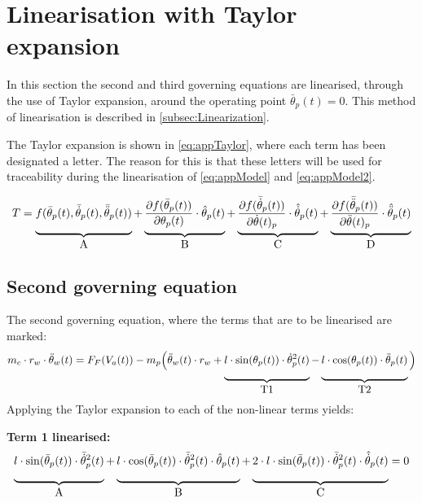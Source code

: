 \section{Linearisation with Taylor expansion}\label{appTaylor}
In this section the second and third governing equations are linearised, through the use of Taylor expansion, around the operating point $\bar{\theta}_p(t) = 0$. This method of linearisation is described in \autoref{subsec:Linearization}.

The Taylor expansion is shown in \autoref{eq:appTaylor}, where each term has been designated a letter. The reason for this is that these letters will be used for traceability during the linearisation of \autoref{eq:appModel} and \autoref{eq:appModel2}.


\begin{align}
T = \underbrace{f(\bar{\theta}_p(t),\bar{\dot \theta}_p(t),\bar{\ddot \theta}_p(t))\rule[-12pt]{0pt}{5pt}}_{\mbox{A}} + \underbrace{\frac{\partial f(\bar{\theta}_p(t))}{\partial\theta_p(t)}\cdot \hat{\theta}_p(t)\rule[-12pt]{0pt}{5pt}}_{\mbox{B}} + \underbrace{\frac{\partial f(\bar{\dot \theta}_p(t))}{\partial \dot \theta(t)_p}\cdot \hat{\dot \theta}_p(t)\rule[-12pt]{0pt}{5pt}}_{\mbox{C}} + \underbrace{\frac{\partial f(\bar{\ddot \theta}_p(t))}{\partial \ddot \theta(t)_p}\cdot \hat{\ddot \theta}_p(t)\rule[-12pt]{0pt}{5pt}}_{\mbox{D}}
\label{eq:appTaylor}
\end{align}

\subsection*{Second governing equation}
The second governing equation, where the terms that are to be linearised are marked:
\begin{align}
m_c \cdot r_w \cdot \ddot \theta_w(t) = F_F(V_a(t)) - m_p\Big(\ddot \theta_w(t) \cdot r_w + \underbrace{l \cdot \sin(\theta_p(t))\cdot \dot\theta_p^2(t)\rule[-12pt]{0pt}{5pt}}_{\mbox{T1}} - \underbrace{l \cdot \cos(\theta_p(t))\cdot \ddot\theta_p(t)\rule[-12pt]{0pt}{5pt}}_{\mbox{T2}}\Big)\label{eq:appModel2}
\end{align}
Applying the Taylor expansion to each of the non-linear terms yields:

\textbf{Term 1 linearised:}
\begin{align}
\underbrace{l \cdot \sin(\bar{\theta}_p(t))\cdot \bar{\dot\theta}_p^2(t)\rule[-12pt]{0pt}{5pt}}_{\mbox{A}} + \underbrace{l \cdot \cos(\bar{\theta}_p(t))\cdot \bar{\dot\theta}_p^2(t) \cdot \hat{\theta}_p(t)\rule[-12pt]{0pt}{5pt}}_{\mbox{B}} + \underbrace{2 \cdot l \cdot \sin(\bar{\theta}_p(t))\cdot \bar{\dot\theta}_p^2(t) \cdot \hat{\dot \theta}_p(t)\rule[-12pt]{0pt}{5pt}}_{\mbox{C}} = 0
\end{align}

